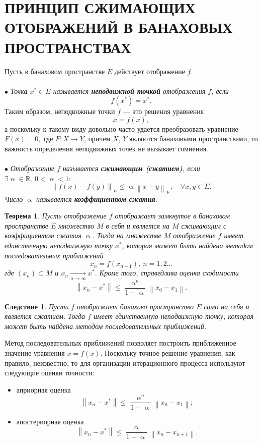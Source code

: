 \documentclass[a4paper, 12pt]{report}
\newcommand\Norm[1]{\left\| #1 \right\|}
\renewcommand{\leq}{\leqslant}
\renewcommand{\alpha}{\upalpha}
\newtheorem*{theorem}{Теорема}
\newtheorem*{cor}{Следствие}
\begin{document}
	\section*{ПРИНЦИП СЖИМАЮЩИХ ОТОБРАЖЕНИЙ В БАНАХОВЫХ ПРОСТРАНСТВАХ}
	Пусть в банаховом пространстве $E$ действует отображение $f$.\\\\
	$\bullet$ \textit{Точка $x^*\in E$ называется \textbf{неподвижной точкой} отображения $f$, если $$f(x^*) = x^*.$$}
	Таким образом, неподвижные точки $f$ --- это решения уравнения $$x = f(x),$$
	а поскольку к такому виду довольно часто удается преобразовать уравнение $F(x) = 0,$ где $F:X\to Y$, причем $X$, $Y$ являются банаховыми пространствами, то важность определения неподвижных точек не вызывает сомнения.\\\\
	$\bullet$ \textit{Отображение $f$ называется \textbf{сжимающим (сжатием)}, если $\exists \alpha \in \mathbb{R},\ 0<\alpha<1:$ $$\Norm{f(x) - f(y)}_E \leq \alpha\Norm{x - y}_E,\quad \forall x,y \in E.$$
	Число $\alpha$ называется \textbf{коэффициентом сжатия}.}
	\begin{theorem}
		Пусть отображение $f$ отображает замкнутое в банаховом пространстве $E$ множество $M$ в себя и является на $M$ сжимающим с коэффициентом сжатия $\alpha$. Тогда на множестве $M$ отображение $f$ имеет единственную неподвижную точку $x^*$, которая может быть найдена методом последовательных приближений
		$$x_n = f(x_{n-1}),\ n=1,2\ldots$$
		где $(x_n)\subset M$ и $x_n\xrightarrow[n\to \infty]{} x^*$. Кроме того, справедлива оценка сходимости $$\Norm{x_n-x^*} \leq \dfrac{\alpha^n}{1-\alpha}\Norm{x_0-x_1}.$$
	\end{theorem}
	\begin{cor}
		Пусть $f$ отображает банахово пространство $E$ само на себя и является сжатием. Тогда $f$ имеет единственную неподвижную точку, которая может быть найдена методом последовательных приближений.
	\end{cor}
	Метод последовательных приближений позволяет построить приближенное значение уравнения $x = f(x)$. Поскольку точное решение уравнения, как правило, неизвестно, то для организации итерационного процесса используют следующие оценки точности: \begin{itemize}
		\item априорная оценка $$\Norm{x_n - x^*} \leq \dfrac{\alpha^n}{1-\alpha}\Norm{x_0 - x_1};$$
		\item апостериорная оценка $$\Norm{x_n - x^*} \leq \dfrac{\alpha}{1 - \alpha}\Norm{x_n - x_{n+1}}.$$
	\end{itemize}
\end{document}
